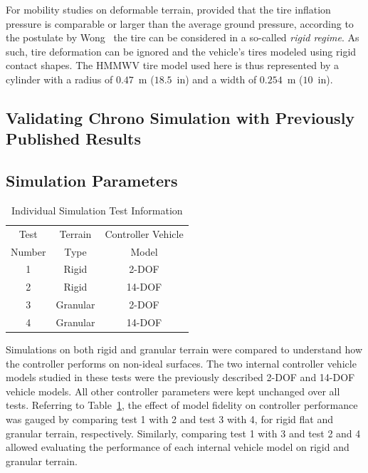 \documentclass[12pt,onecolumn]{article}
\begin{document}
For mobility studies on deformable terrain, provided that the tire inflation pressure is comparable or larger than the average ground pressure, according to the postulate by Wong~\cite{wong93} the tire can be considered in a so-called {\em rigid regime}.  As such, tire deformation can be ignored and the vehicle's tires modeled using rigid contact shapes.  The HMMWV tire model used here is thus represented by a cylinder with a radius of $0.47$~m ($18.5$~in) and a width of $0.254$~m ($10$~in).


\subsection{Validating Chrono Simulation with Previously Published Results}\label{Validate}


\subsection{Simulation Parameters}\label{SimParameters}

\begin{table}
\begin{center}
	\begin{tabular}{||c |c | c||} 
		\hline
		Test  & Terrain  & Controller Vehicle \\
		Number &  Type & Model\\ [0.5ex] 	
		\hline\hline
		1 & Rigid & 2-DOF \\ 
		\hline
		2 & Rigid & 14-DOF \\
		\hline
		3 & Granular & 2-DOF \\
		\hline
		4 & Granular & 14-DOF \\
		\hline
	\end{tabular}
\end{center}
\caption{Individual Simulation Test Information}
\label{t:TestMatrix}
\end{table}

Simulations on both rigid and granular terrain were compared to understand how the controller performs on non-ideal surfaces.  The two internal controller vehicle models studied in these tests were the previously described 2-DOF and 14-DOF vehicle models. All other controller parameters were kept unchanged over all tests. Referring to Table~\ref{t:TestMatrix}, the effect of model fidelity on controller performance was gauged by comparing test 1 with 2 and test 3 with 4, for rigid flat and granular terrain, respectively.
Similarly, comparing test 1 with 3 and test 2 and 4 allowed evaluating the performance of each internal vehicle model on rigid and granular terrain.
\end{document}

